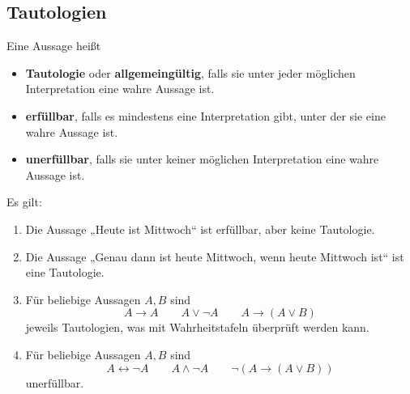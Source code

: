 \subsection*{Tautologien}


\begin{defin} \label{def:tautologie} 
    Eine Aussage heißt
    \begin{itemize}
        \item \textbf{Tautologie} oder \textbf{allgemeingültig}, falls sie unter jeder möglichen Interpretation eine wahre Aussage ist.
        \item \textbf{erfüllbar}, falls es mindestens eine Interpretation gibt, unter der sie eine wahre Aussage ist.
        \item \textbf{unerfüllbar}, falls sie unter keiner möglichen Interpretation eine wahre Aussage ist.
    \end{itemize}
\end{defin}


\begin{bsp}
    Es gilt:
    \begin{enumerate}
        \item Die Aussage „Heute ist Mittwoch“ ist erfüllbar, aber keine Tautologie.
        \item Die Aussage „Genau dann ist heute Mittwoch, wenn heute Mittwoch ist“ ist eine Tautologie.
        \item Für beliebige Aussagen $A,B$ sind
            \[ A \to A \qquad A\lor \neg A  \qquad A \to (A\lor B) \]
        jeweils Tautologien, was mit Wahrheitstafeln überprüft werden kann.
        \item Für beliebige Aussagen $A,B$ sind
            \[ A \leftrightarrow \neg A \qquad A\land \neg A \qquad  \neg(A\to (A\lor B))\]
        unerfüllbar.
    \end{enumerate}
\end{bsp}
 
